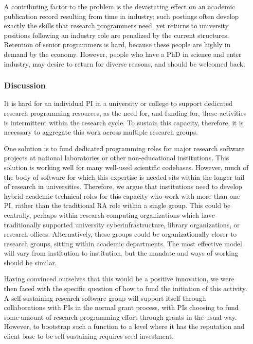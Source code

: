 A contributing factor to the problem is the devastating effect on an academic
publication record resulting from time in industry; such postings often
develop exactly the skills that research programmers need, yet returns to
university positions following an industry role are penalized by the current
structures. Retention of senior programmers is hard, because these people
are highly in demand by the economy. However,
people who have a PhD in science and enter industry,
may desire to return for diverse reasons, and should be welcomed back.

\subsubsection{Discussion}

It is hard for an individual PI in a university or college
to support dedicated research programming
resources, as the need for, and funding for, these activities is intermittent
within the research cycle. To sustain this capacity, therefore, it is
necessary to aggregate this work across multiple research groups.

One solution is to fund dedicated programming roles for major research software
projects at national laboratories or other non-educational institutions. This
solution is working well for many well-used scientific codebases.
However, much of the body of software for which this expertise is needed sits
within the longer tail of research in universities. Therefore, we argue that
institutions need to develop hybrid academic-technical roles for this capacity
who work with more than one PI, rather than the traditional RA role within a
single group. This could be centrally, perhaps within research computing
organizations which have traditionally supported university cyberinfrastructure,
library organizations, or research offices. Alternatively, these groups could
be organizationally closer to research groups, sitting within academic
departments. The most
effective model will vary from institution to institution,
but the mandate and ways of working should be similar.

Having convinced ourselves that this would be a positive innovation, we were
then faced with the specific question of how to fund the initiation of this
activity. A self-sustaining research software group will support itself
through collaborations with PIs in the normal grant process, with PIs choosing
to fund some amount of research programming effort through grants in the usual
way. However, to bootstrap such a function to a level where it has the
reputation and client base to be self-sustaining requires seed investment.

